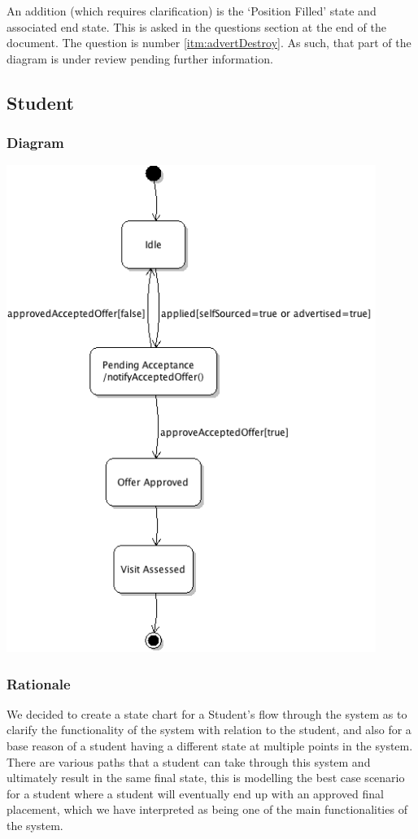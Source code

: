 \documentclass[11pt]{article}
\begin{document}
An addition (which requires clarification) is the `Position Filled' state and
associated end state. This is asked in the questions section at the end of the
document. The question is number \ref{itm:advertDestroy}. As such, that part of 
the diagram is under review pending further information.

\subsection{Student}

\subsubsection{Diagram}

\includegraphics[width=0.9\textwidth]{studentState.png}

\subsubsection{Rationale}

We decided to create a state chart for a Student's flow through the
system as to clarify the functionality of the system with relation to
the student, and also for a base reason of a student having a
different state at multiple points in the system. There are various
paths that a student can take through this system and ultimately
result in the same final state, this is modelling the best case
scenario for a student where a student will eventually end up with an
approved final placement, which we have interpreted as being one of
the main functionalities of the system. 
\end{document}
